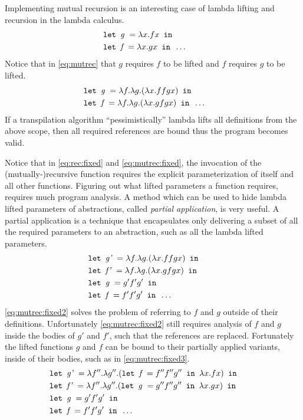 Implementing mutual recursion is an interesting case of lambda lifting and recursion in the lambda calculus.
\begin{align}
  &\texttt{let } \textit{g } = \lambda x.f x \texttt{ in } \label{eq:mutrec}\\
  &\texttt{let } \textit{f } = \lambda x.g x \texttt{ in } \dots \tag*{}
\end{align}
Notice that in \autoref{eq:mutrec} that $g$ requires $f$ to be lifted and $f$ requires $g$ to be lifted.
\begin{align}
  &\texttt{let } \textit{g } = \lambda f. \lambda g.(\lambda x.f f g x) \texttt{ in } \label{eq:mutrec:fixed}\\
  &\texttt{let } \textit{f } = \lambda f. \lambda g.(\lambda x.g f g x) \texttt{ in } \dots \tag*{}
\end{align}
If a transpilation algorithm ``pessimistically'' lambda lifts all definitions from the above scope, then all required references are bound thus the program becomes valid.

Notice that in \autoref{eq:rec:fixed} and \autoref{eq:mutrec:fixed}, the invocation of the (mutually-)recursive function requires the explicit parameterization of itself and all other functions.
Figuring out what lifted parameters a function requires, requires much program analysis.
A method which can be used to hide lambda lifted parameters of abstractions, called \textit{partial application}, is very useful.
A partial application is a technique that encapsulates only delivering a subset of all the required parameters to an abstraction, such as all the lambda lifted parameters.
\begin{align}
  &\texttt{let } \textit{g' } = \lambda f. \lambda g.(\lambda x.f f g x) \texttt{ in } \label{eq:mutrec:fixed2}\\
  &\texttt{let } \textit{f' } = \lambda f. \lambda g.(\lambda x.g f g x) \texttt{ in }  \tag*{}\\
  &\texttt{let } \textit{g } = g' f' g' \texttt{ in }  \tag*{}\\
  &\texttt{let } \textit{f } = f' f' g' \texttt{ in } \dots \tag*{}
\end{align}
\autoref{eq:mutrec:fixed2} solves the problem of referring to $f$ and $g$ outside of their definitions.
Unfortunately \autoref{eq:mutrec:fixed2} still requires analysis of $f$ and $g$ inside the bodies of $g'$ and $f'$, such that the references are replaced.
Fortunately the lifted functions $g$ and $f$  can be bound to their partially applied variants, inside of their bodies, such as in \autoref{eq:mutrec:fixed3}.
\begin{align}
  &\texttt{let } \textit{g' } = \lambda f''. \lambda g''.(\texttt{let } \textit{f } = f'' f'' g'' \texttt{ in } \lambda x.f x) \texttt{ in } \label{eq:mutrec:fixed3}\\
  &\texttt{let } \textit{f' } = \lambda f''. \lambda g''.(\texttt{let } \textit{g } = g'' f'' g'' \texttt{ in } \lambda x.g x) \texttt{ in }  \tag*{}\\
  &\texttt{let } \textit{g } = g' f' g' \texttt{ in }  \tag*{}\\
  &\texttt{let } \textit{f } = f' f' g' \texttt{ in } \dots \tag*{}
\end{align}

